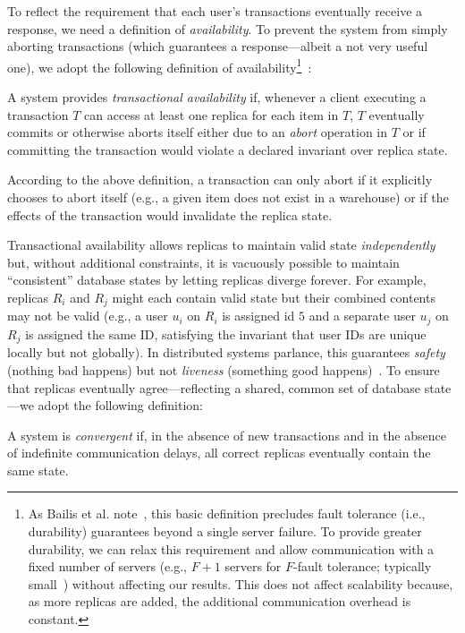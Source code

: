 To reflect the requirement that each user's
transactions eventually receive a response, we need a definition of
\textit{availability}. To prevent the system from simply aborting
transactions (which guarantees a response---albeit a not very useful
one), we adopt the following definition of availability\footnote{As
  Bailis et al. note~\cite{hat-vldb}, this basic definition precludes
  fault tolerance (i.e., durability) guarantees beyond a single server
  failure. To provide greater durability, we can relax this
  requirement and allow communication with a fixed number of servers
  (e.g., $F+1$ servers for $F$-fault tolerance; typically
  small~\cite{bigtable,spanner,dynamo}) without affecting our
  results. This does not affect scalability because, as more replicas
  are added, the additional communication overhead is
  constant.}~\cite{hat-vldb}:

\begin{definition} 
A system provides \textit{transactional availability} if, whenever a
client executing a transaction $T$ can access at least one replica for
each item in $T$, $T$ eventually commits or otherwise aborts itself
either due to an \textit{abort} operation in $T$ or if committing the
transaction would violate a declared invariant over replica state.
\end{definition}

According to the above definition, a transaction can only abort if it
explicitly chooses to abort itself (e.g., a given item does not exist
in a warehouse) or if the effects of the transaction would invalidate
the replica state.

 Transactional availability allows replicas to
maintain valid state \textit{independently} but, without additional
constraints, it is vacuously possible to maintain ``consistent''
database states by letting replicas diverge forever. For example,
replicas $R_i$ and $R_j$ might each contain valid state but their
combined contents may not be valid (e.g., a user $u_i$ on $R_i$ is
assigned id $5$ and a separate user $u_j$ on $R_j$ is assigned the
same ID, satisfying the invariant that user IDs are unique locally but
not globally). In distributed systems parlance, this guarantees
\textit{safety} (nothing bad happens) but not \textit{liveness}
(something good happens)~\cite{lamport-safety}. To ensure that
replicas eventually agree---reflecting a shared, common set of
database state---we adopt the following definition:

\begin{definition}A system is \textit{convergent} if, in the
absence of new transactions and in the absence of indefinite
communication delays, all correct replicas eventually contain the same
state.
\end{definition}

